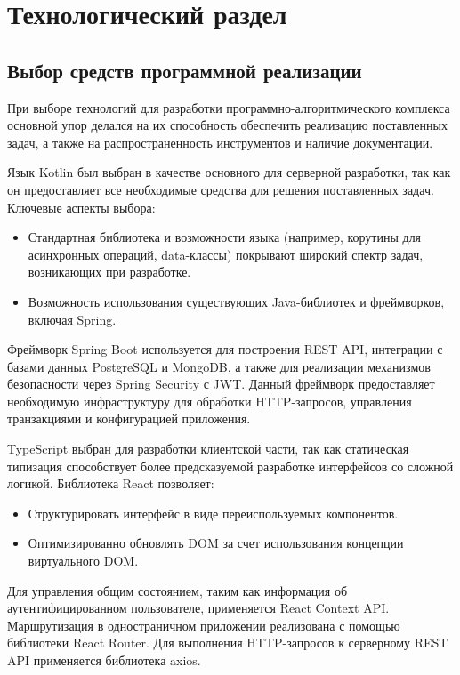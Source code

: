 \chapter{Технологический раздел}

\section{Выбор средств программной реализации}

При выборе технологий для разработки программно-алгоритмического комплекса основной упор делался на их способность обеспечить реализацию поставленных задач, а также на распространенность инструментов и наличие документации.

Язык Kotlin был выбран в качестве основного для серверной разработки, так как он предоставляет все необходимые средства для решения поставленных задач. 
Ключевые аспекты выбора:
\begin{itemize}[wide=12.5mm, leftmargin=12.5mm]
    \item Стандартная библиотека и возможности языка (например, корутины для асинхронных операций, data-классы) покрывают широкий спектр задач, возникающих при разработке.
    \item Возможность использования существующих Java-библиотек и фреймворков, включая Spring.
\end{itemize}

Фреймворк Spring Boot используется для построения REST API, интеграции с базами данных PostgreSQL и MongoDB, а также для реализации механизмов безопасности через Spring Security с JWT. 
Данный фреймворк предоставляет необходимую инфраструктуру для обработки HTTP-запросов, управления транзакциями и конфигурацией приложения.

TypeScript выбран для разработки клиентской части, так как статическая типизация способствует более предсказуемой разработке интерфейсов со сложной логикой. 
Библиотека React позволяет:
\begin{itemize}[wide=12.5mm, leftmargin=12.5mm]
    \item Структурировать интерфейс в виде переиспользуемых компонентов.
    \item Оптимизированно обновлять DOM за счет использования концепции виртуального DOM.
\end{itemize}

Для управления общим состоянием, таким как информация об аутентифицированном пользователе, применяется React Context API. 
Маршрутизация в одностраничном приложении реализована с помощью библиотеки React Router.
Для выполнения HTTP-запросов к серверному REST API применяется библиотека axios.

